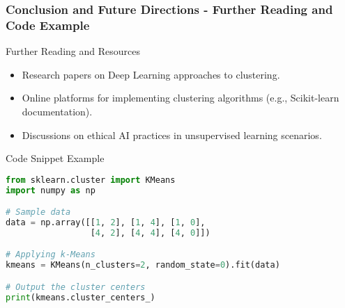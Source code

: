 \documentclass[aspectratio=169]{beamer}
\begin{document}
\begin{frame}[fragile]
    \frametitle{Conclusion and Future Directions - Further Reading and Code Example}
    \begin{block}{Further Reading and Resources}
        \begin{itemize}
            \item Research papers on Deep Learning approaches to clustering.
            \item Online platforms for implementing clustering algorithms (e.g., Scikit-learn documentation).
            \item Discussions on ethical AI practices in unsupervised learning scenarios.
        \end{itemize}
    \end{block}
    
    \begin{block}{Code Snippet Example}
    \begin{lstlisting}[language=Python]
from sklearn.cluster import KMeans
import numpy as np

# Sample data
data = np.array([[1, 2], [1, 4], [1, 0],
                 [4, 2], [4, 4], [4, 0]])

# Applying k-Means
kmeans = KMeans(n_clusters=2, random_state=0).fit(data)

# Output the cluster centers
print(kmeans.cluster_centers_)
    \end{lstlisting}
    \end{block}
\end{frame}
\end{document}

